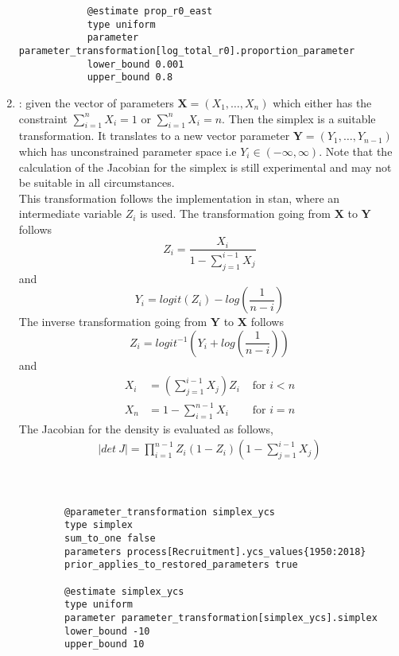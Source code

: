 \begin{enumerate}
{{\begin{verbatim}
			@estimate prop_r0_east
			type uniform
			parameter parameter_transformation[log_total_r0].proportion_parameter
			lower_bound 0.001
			upper_bound 0.8		
\end{verbatim}}}

\item {} : given the vector of parameters $\mathbf{X} = (X_1, \dots, X_n)$ which either has the constraint $\sum_{i = 1}^n X_i = 1$ or $\sum_{i = 1}^n X_i = n$. Then the simplex is a suitable transformation. It translates to a new vector parameter \(\mathbf{Y} = (Y_1, \dots, Y_{n - 1})\) which has unconstrained parameter space i.e \(Y_i \in (-\infty, \infty)\). Note that the calculation of the Jacobian for the simplex is still experimental and may not be suitable in all circumstances.\\

This transformation follows the implementation in stan, where an intermediate variable \(Z_i\) is used. The transformation going from $\mathbf{X}$ to $\mathbf{Y}$ follows\\
\[
Z_i = \frac{X_i}{1 - \sum_{j = 1}^{i - 1}X_j}
\]
and 
\[
Y_i = logit(Z_i) - log\left(\frac{1}{n -i}\right)
\]
The inverse transformation going from $\mathbf{Y}$ to $\mathbf{X}$ follows
\[
Z_i = logit^{-1}\left(Y_i +  log\left(\frac{1}{n -i}\right)\right)
\]
and
\begin{align*}
	X_i &= \left( \sum_{j = 1}^{i - 1}X_j\right)Z_i & \text{ for } i < n\\
	X_n &= 1 - \sum_{i = 1}^{n - 1} X_i & \text{ for } i = n
\end{align*}
The Jacobian for the density is evaluated as follows,
\begin{align*}
|det \ J| = \prod_{i = 1}^{n - 1} Z_i \left(1 - Z_i\right) \left(1 - \sum_{j = 1}^{i - 1}X_j\right)
\end{align*}
\\
\\
\label{sec:Transformation-Simplex}
{\small{\begin{verbatim}
		@parameter_transformation simplex_ycs
		type simplex
		sum_to_one false
		parameters process[Recruitment].ycs_values{1950:2018}
		prior_applies_to_restored_parameters true
		
		@estimate simplex_ycs
		type uniform
		parameter parameter_transformation[simplex_ycs].simplex
		lower_bound -10
		upper_bound 10


\end{verbatim}}}
\end{enumerate}
